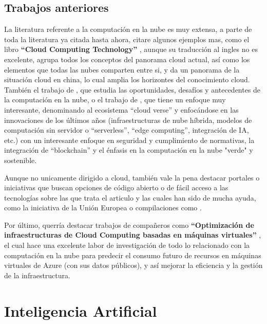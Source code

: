 \subsection{Trabajos anteriores}

La literatura referente a la computación en la nube es muy extensa, a parte de toda la literatura ya citada hasta ahora, citare algunos ejemplos mas, como el libro \textbf{``Cloud Computing Technology''} \citep{huawei2023cloud}, aunque su traducción al ingles no es excelente, agrupa todos los conceptos del panorama cloud actual, así como los elementos que todas las nubes comparten entre si, y da un panorama de la situación cloud en china, lo cual amplia los horizontes del conocimiento cloud. También el trabajo de \citep{nigro2022}, que estudia las oportunidades, desafíos y antecedentes de la computación en la nube, o el trabajo de \citep{bommala2024}, que tiene un enfoque muy interesante, denominando al ecosistema ``cloud verse'' y enfocándose en las innovaciones de los últimos años (infraestructuras de nube híbrida, modelos de computación sin servidor o ``serverless'', ``edge computing'', integración de IA, etc.) con un interesante enfoque en seguridad y cumplimiento de normativas, la integración de ``blockchain'' y el énfasis en la computación en la nube "verde" y sostenible. 

Aunque no unicamente dirigido a cloud, también vale la pena destacar portales o iniciativas que buscan opciones de código abierto o de fácil acceso a las tecnologías sobre las que trata el articulo y las cuales han sido de mucha ayuda, como la iniciativa de la Unión Europea \citep{EuropeanAlternatives} o compilaciones como \citep{free-for-dev}.

Por último, querría destacar trabajos de compañeros como \textbf{``Optimización de infraestructuras de Cloud Computing basadas en máquinas virtuales''} \citep{sanchez2023optimizacion}, el cual hace una excelente labor de investigación de todo lo relacionado con la computación en la nube para predecir el consumo futuro de recursos en máquinas virtuales de Azure (con sus datos públicos), y así mejorar la eficiencia y la gestión de la infraestructura. \newpage

\section{Inteligencia Artificial}
\label{sec:EstudiosIA}

